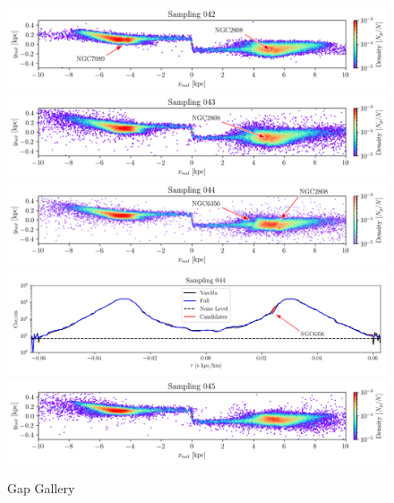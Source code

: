 \documentclass{aa}
\begin{document}
\begin{appendix}
    \begin{figure}
      \centering
      \includegraphics[width=\linewidth]{gallery_of_gaps_monte-carlo-042.png}
      \includegraphics[width=\linewidth]{gallery_of_gaps_monte-carlo-043.png}
      \includegraphics[width=\linewidth]{gallery_of_gaps_monte-carlo-044.png}
      \includegraphics[width=\linewidth]{tau-profile-monte-carlo-044.png}
      \includegraphics[width=\linewidth]{gallery_of_gaps_monte-carlo-045.png}
      \caption{Gap Gallery}
      \label{fig:gallery010}
    \end{figure}   


\end{appendix}
\end{document}

